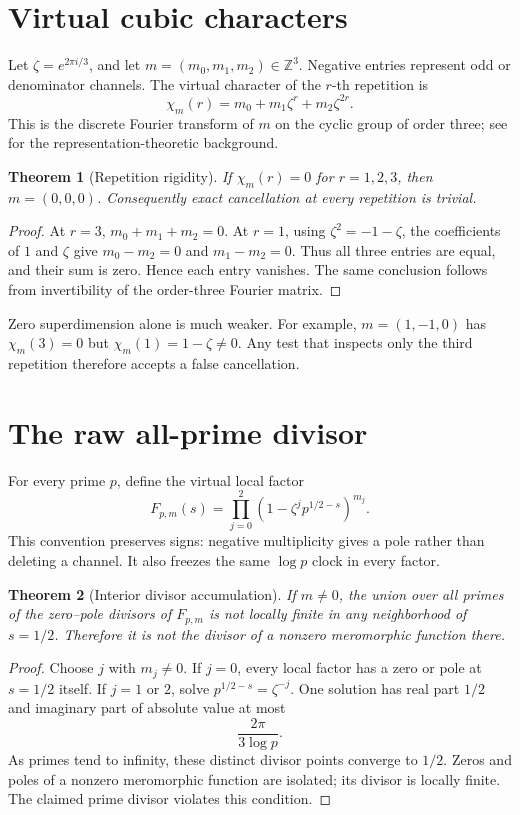 \documentclass[11pt]{article}
\newtheorem{theorem}{Theorem}[section]
\theoremstyle{remark}\newtheorem{remark}[theorem]{Remark}
\begin{document}
\section{Virtual cubic characters}
Let \(\zeta=e^{2\pi i/3}\), and let
\(m=(m_0,m_1,m_2)\in\mathbb Z^3\).  Negative entries represent odd or
denominator channels.  The virtual character of the \(r\)-th repetition is
\begin{equation}\label{eq:char}
 \chi_m(r)=m_0+m_1\zeta^r+m_2\zeta^{2r}.
\end{equation}
This is the discrete Fourier transform of \(m\) on the cyclic group of order
three; see \cite{Serre1977} for the representation-theoretic background.

\begin{theorem}[Repetition rigidity]\label{thm:fourier}
If \(\chi_m(r)=0\) for \(r=1,2,3\), then \(m=(0,0,0)\).
Consequently exact cancellation at every repetition is trivial.
\end{theorem}
\begin{proof}
At \(r=3\), \(m_0+m_1+m_2=0\).  At \(r=1\), using
\(\zeta^2=-1-\zeta\), the coefficients of \(1\) and \(\zeta\) give
\(m_0-m_2=0\) and \(m_1-m_2=0\).  Thus all three entries are equal, and
their sum is zero.  Hence each entry vanishes.  The same conclusion follows
from invertibility of the order-three Fourier matrix.
\end{proof}

Zero superdimension alone is much weaker.  For example, \(m=(1,-1,0)\)
has \(\chi_m(3)=0\) but \(\chi_m(1)=1-\zeta\ne0\).  Any test that inspects
only the third repetition therefore accepts a false cancellation.

\section{The raw all-prime divisor}
For every prime \(p\), define the virtual local factor
\begin{equation}\label{eq:local}
 F_{p,m}(s)=\prod_{j=0}^{2}
 (1-\zeta^j p^{1/2-s})^{m_j}.
\end{equation}
This convention preserves signs: negative multiplicity gives a pole rather
than deleting a channel.  It also freezes the same \(\log p\) clock in every
factor.

\begin{theorem}[Interior divisor accumulation]\label{thm:accum}
If \(m\ne0\), the union over all primes of the zero--pole divisors of
\(F_{p,m}\) is not locally finite in any neighborhood of \(s=1/2\).
Therefore it is not the divisor of a nonzero meromorphic function there.
\end{theorem}
\begin{proof}
Choose \(j\) with \(m_j\ne0\).  If \(j=0\), every local factor has a zero
or pole at \(s=1/2\) itself.  If \(j=1\) or \(2\), solve
\(p^{1/2-s}=\zeta^{-j}\).  One solution has real part \(1/2\) and imaginary
part of absolute value at most
\[
 \frac{2\pi}{3\log p}.
\]
As primes tend to infinity, these distinct divisor points converge to
\(1/2\).  Zeros and poles of a nonzero meromorphic function are isolated;
its divisor is locally finite.  The claimed prime divisor violates this
condition.
\end{proof}
\end{document}
